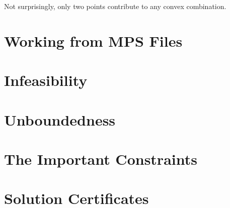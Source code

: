 
Not surprisingly, only two points contribute to any convex
combination.

\section{Working from MPS Files}

\section{Infeasibility}\label{sec:QP-infeasible}

\section{Unboundedness}\label{sec:QP-unbounded}


\section{The Important Constraints}

\section{Solution Certificates}



